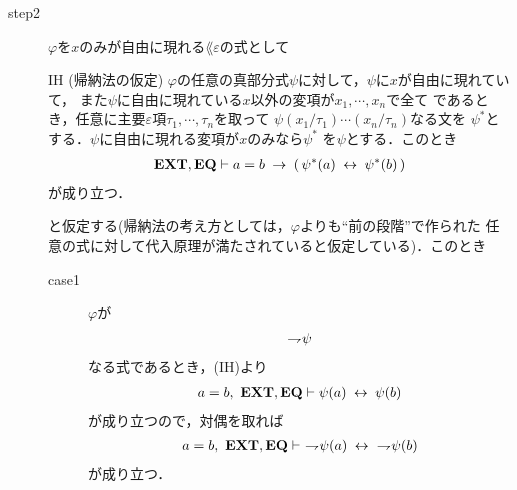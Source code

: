 \begin{sketch}
\begin{description}
			\item[step2]
				$\varphi$を$x$のみが自由に現れる$\lang{\varepsilon}$の式として
				\begin{itembox}[l]{IH (帰納法の仮定)}
					$\varphi$の任意の真部分式$\psi$に対して，$\psi$に$x$が自由に現れていて，
					また$\psi$に自由に現れている$x$以外の変項が$x_{1},\cdots,x_{n}$で全て
					であるとき，任意に主要$\varepsilon$項$\tau_{1},\cdots,\tau_{n}$を取って
					$\psi(x_{1}/\tau_{1})\cdots(x_{n}/\tau_{n})$なる文を
					$\psi^{*}$とする．$\psi$に自由に現れる変項が$x$のみなら$\psi^{*}$
					を$\psi$とする．このとき
					\begin{align}
						\mbox{{\bf EXT}},\mbox{{\bf EQ}} \vdash a = b \hspace{0.25em}\rightarrow\hspace{0.25em} 
						(\, \psi^{*}(a) \hspace{0.25em}\leftrightarrow\hspace{0.25em} \psi^{*}(b)\, )
					\end{align}
					が成り立つ．
				\end{itembox}
				と仮定する(帰納法の考え方としては，$\varphi$よりも``前の段階''で作られた
				任意の式に対して代入原理が満たされていると仮定している)．このとき
				\begin{description}
					\item[case1] $\varphi$が
						\begin{align}
							\rightharpoondown\hspace{-0.25em} \psi
						\end{align}
						なる式であるとき，(IH)より
						\begin{align}
							a = b,\ \mbox{{\bf EXT}},\mbox{{\bf EQ}} \vdash \psi(a) \hspace{0.25em}\leftrightarrow\hspace{0.25em} \psi(b)
						\end{align}
						が成り立つので，対偶を取れば
						\begin{align}
							a = b,\ \EXTAX,\EQAX \vdash\ 
							\negation \psi(a) \lrarrow\ \negation \psi(b)
						\end{align}
						が成り立つ．
						

\end{description}
\end{description}
\end{sketch}
